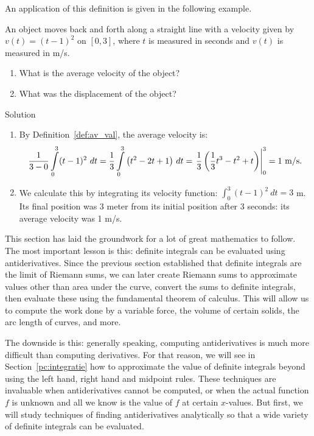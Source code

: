 An application of this definition is given in the following example.\\

\enlargethispage{2\baselineskip}

\begin{example}\label{ex_ftc10}
An object moves back and forth along a straight line with a velocity given by $v(t) = (t-1)^2$ on $[0,3]$, where $t$ is measured in seconds and $v(t)$ is measured in m/s. 

\begin{enumerate}
\item What is the average velocity of the object?
\item What was the displacement of the object?
\end{enumerate}

Solution 

\begin{enumerate}
\item By Definition~\ref{def:av_val}, the average velocity is:
	$$\frac{1}{3-0}\ds \int\limits_0^3 (t-1)^2\ dt =\frac13 \ds \int\limits_0^3 \big(t^2-2t+1\big)\ dt = \left.\frac13\left(\frac13t^3-t^2+t\right)\right|_0^3 = 1\text{ m/s}.$$
\item We calculate this by integrating its velocity function: $\int_0^3 (t-1)^2\ dt = 3$ m. Its final position was 3 meter from its initial position after 3 seconds: its average velocity was 1 m/s.
\end{enumerate}
\end{example}

This section has laid the groundwork for a lot of great mathematics to follow. The most important lesson is this: definite integrals can be evaluated using antiderivatives. Since the previous section established that definite integrals are the limit of Riemann sums, we can later create Riemann sums to approximate values other than area under the curve, convert the sums to definite integrals, then evaluate these using the fundamental theorem of calculus. This will allow us to compute the work done by a variable force, the volume of certain solids, the arc length of curves, and more.

The downside is this: generally speaking, computing antiderivatives is much more difficult than computing derivatives. For that reason, we will see in Section~\ref{pc:integratie}  how to approximate the value of definite integrals beyond using the left hand, right hand and midpoint rules. These techniques are invaluable when antiderivatives cannot be computed, or when the actual function $f$ is unknown and all we know is the value of $f$ at certain $x$-values. But first, we will study techniques of finding antiderivatives analytically so that a wide variety of definite integrals can be evaluated. 


